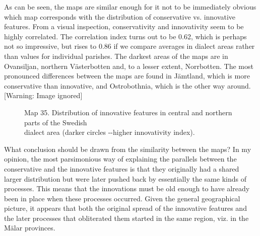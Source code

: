 \begin{stylecaption}
As can be seen, the maps are similar enough for it not to be immediately obvious which map corresponds with the distribution of conservative vs. innovative features. From a visual inspection, conservativity and innovativity seem to be highly correlated. The correlation index turns out to be 0.62, which is perhaps not so impressive, but rises to 0.86 if we compare averages in dialect areas rather than values for individual parishes. The darkest areas of the maps are in Ovansiljan, northern Västerbotten and, to a lesser extent, Norrbotten. The most pronounced differences between the maps are found in Jämtland, which is more conservative than innovative, and Ostrobothnia, which is the other way around.   [Warning: Image ignored] %
 

\end{stylecaption}

\begin{figure}[h]

\begin{minipage}{6.302in}

\begin{stylecaption}
Map 35. Distribution of innovative features in central and northern parts of the Swedish\\
 dialect area (darker circles -{}-higher innovativity index).

\end{stylecaption}

\end{minipage}

\end{figure}

\begin{styleBodytextC}
What conclusion should be drawn from the similarity between the maps? In my opinion, the most parsimonious way of explaining the parallels between the conservative and the innovative features is that they originally had a shared larger distribution but were later pushed back by essentially the same kinds of processes. This means that the innovations must be old enough to have already been in place when these processes occurred. Given the general geographical picture, it appears that both the original spread of the innovative features and the later processes that obliterated them started in the same region, viz. in the Mälar provinces. 

\end{styleBodytextC}

